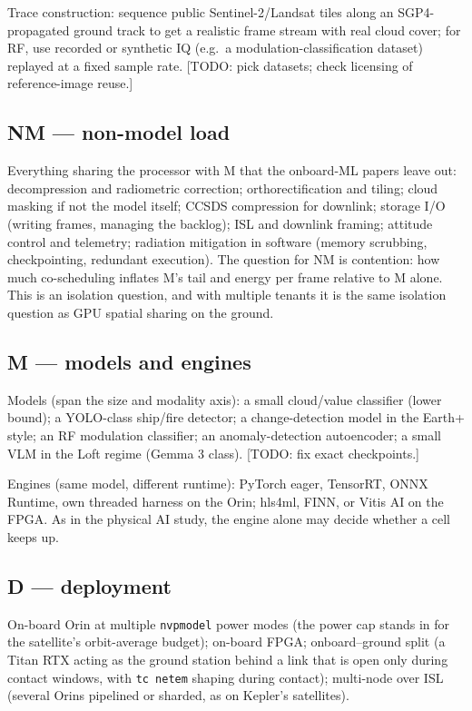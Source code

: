 \documentclass[11pt]{article}
\newcommand{\todo}[1]{\textcolor{blue!60!black}{[TODO: #1]}}
\begin{document}
Trace construction: sequence public Sentinel-2/Landsat tiles along an SGP4-propagated ground track to get
a realistic frame stream with real cloud cover; for RF, use recorded or synthetic IQ (e.g.\ a
modulation-classification dataset) replayed at a fixed sample rate. \todo{pick datasets; check licensing of
reference-image reuse.}

\subsection{NM --- non-model load}

Everything sharing the processor with M that the onboard-ML papers leave out: decompression and
radiometric correction; orthorectification and tiling; cloud masking if not the model itself; CCSDS
compression for downlink; storage I/O (writing frames, managing the backlog); ISL and downlink framing;
attitude control and telemetry; radiation mitigation in software (memory scrubbing, checkpointing,
redundant execution). The question for NM is contention: how much co-scheduling inflates M's tail and
energy per frame relative to M alone. This is an isolation question, and with multiple tenants it is the
same isolation question as GPU spatial sharing on the ground.

\subsection{M --- models and engines}

Models (span the size and modality axis): a small cloud/value classifier (lower bound); a YOLO-class
ship/fire detector; a change-detection model in the Earth+ style; an RF modulation classifier; an
anomaly-detection autoencoder; a small VLM in the Loft regime (Gemma 3 class). \todo{fix exact
checkpoints.}

Engines (same model, different runtime): PyTorch eager, TensorRT, ONNX Runtime, own threaded harness on
the Orin; hls4ml, FINN, or Vitis AI on the FPGA. As in the physical AI study, the engine alone may decide
whether a cell keeps up.

\subsection{D --- deployment}

On-board Orin at multiple \texttt{nvpmodel} power modes (the power cap stands in for the satellite's
orbit-average budget); on-board FPGA; onboard--ground split (a Titan RTX acting as the ground station
behind a link that is open only during contact windows, with \texttt{tc netem} shaping during contact);
multi-node over ISL (several Orins pipelined or sharded, as on Kepler's satellites).
\end{document}
